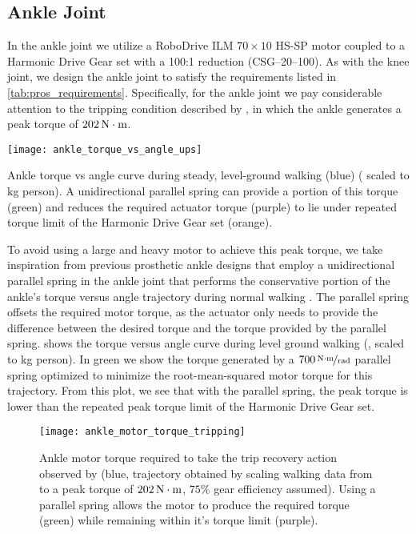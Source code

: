 \subsection{Ankle Joint}
In the ankle joint we utilize a RoboDrive ILM $70\times10$ HS-SP motor coupled
to a Harmonic Drive Gear set with a 100:1 reduction (CSG--20--100). As with the
knee joint, we design the ankle joint to satisfy the requirements listed in
\cref{tab:pros_requirements}. Specifically, for the ankle joint we pay
considerable attention to the tripping condition described by
\citet{pijnappels2005early}, in which the ankle generates a peak torque of
$\unit[202]{N \cdot m}$. 

\begin{marginfigure}[-0in]
    \centering 
    \texttt{[image: ankle\_torque\_vs\_angle\_ups]}
    \caption{Ankle torque vs angle curve during steady, level-ground walking
    (blue) (\citet{winter2009biomechanics} scaled to \unit[80]{kg} person). A
    unidirectional parallel spring can provide a portion of this torque (green)
    and reduces the required actuator torque (purple) to lie under repeated
    torque limit of the Harmonic Drive Gear set (orange).
    }\label{fig:ankle_torque_vs_angle_ups}
\end{marginfigure}
To avoid using a large and heavy motor to achieve this peak torque, we take
inspiration from previous prosthetic ankle designs that employ a unidirectional
parallel spring in the ankle joint that performs the conservative portion of the
ankle's torque versus angle trajectory during normal walking
\citep{au2007biomechanical,au2008powered,sup2009preliminary,lawson2014robotic}.
The parallel spring offsets the required motor torque, as the actuator only
needs to provide the difference between the desired torque and the torque
provided by the parallel spring.  shows the
torque versus angle curve during level ground walking
(\citet{winter2009biomechanics}, scaled to \unit[80]{kg} person). In green we
show the torque generated by a $\unitfrac[700]{N \cdot m}{rad}$ parallel spring
optimized to minimize the root-mean-squared motor torque for this trajectory.
From this plot, we see that with the parallel spring, the peak torque is lower
than the repeated peak torque limit of the Harmonic Drive Gear set.
\begin{figure}[b]
    \centering 
    \texttt{[image: ankle\_motor\_torque\_tripping]}
    \caption{Ankle motor torque required to take the trip recovery action
    observed by \citet{pijnappels2005early} (blue, trajectory obtained by
    scaling walking data from \citet{winter2009biomechanics} to a peak torque of
    $\unit[202]{N \cdot m}$, $75\%$ gear efficiency assumed). Using a parallel
    spring allows the motor to produce the required torque (green) while
    remaining within it's torque limit (purple).
    }\label{fig:ankle_motor_torque_tripping}
\end{figure}


